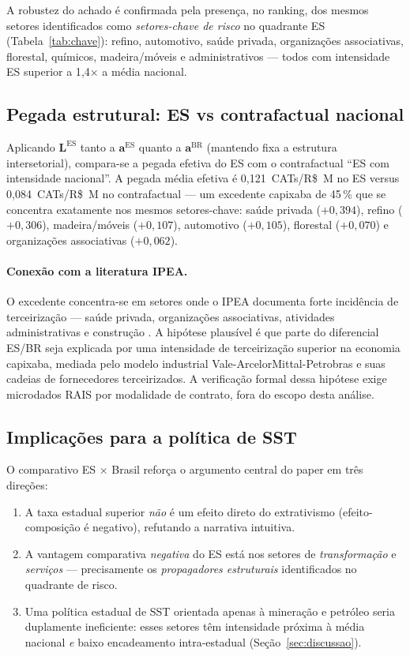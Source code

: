 \documentclass[12pt, a4paper]{article}
\begin{document}
A robustez do achado é confirmada pela presença, no ranking, dos
mesmos setores identificados como \textit{setores-chave de risco}
no quadrante ES (Tabela~\ref{tab:chave}): refino, automotivo, saúde
privada, organizações associativas, florestal, químicos, madeira/móveis
e administrativos --- todos com intensidade ES superior a 1{,}4× a
média nacional.

\subsection{Pegada estrutural: ES vs contrafactual nacional}

Aplicando $\mathbf{L}^{\text{ES}}$ tanto a $\mathbf{a}^{\text{ES}}$
quanto a $\mathbf{a}^{\text{BR}}$ (mantendo fixa a estrutura
intersetorial), compara-se a pegada efetiva do ES com o contrafactual
``ES com intensidade nacional''. A pegada média efetiva é
0{,}121~CATs/R\$~M no ES versus 0{,}084~CATs/R\$~M no contrafactual ---
um excedente capixaba de 45\,\% que se concentra exatamente nos
mesmos setores-chave: saúde privada ($+0{,}394$), refino ($+0{,}306$),
madeira/móveis ($+0{,}107$), automotivo ($+0{,}105$), florestal
($+0{,}070$) e organizações associativas ($+0{,}062$).

\paragraph{Conexão com a literatura IPEA.}
O excedente concentra-se em setores onde o IPEA documenta forte
incidência de terceirização --- saúde privada, organizações
associativas, atividades administrativas e construção
\citep{ipea2024terc}. A hipótese plausível é que parte do diferencial
ES/BR seja explicada por uma intensidade de terceirização superior
na economia capixaba, mediada pelo modelo industrial Vale-ArcelorMittal-Petrobras
e suas cadeias de fornecedores terceirizados. A verificação formal
dessa hipótese exige microdados RAIS por modalidade de contrato,
fora do escopo desta análise.

\subsection{Implicações para a política de SST}

O comparativo ES $\times$ Brasil reforça o argumento central do paper
em três direções:
%
\begin{enumerate}
  \item A taxa estadual superior \textit{não} é um efeito direto do
    extrativismo (efeito-composição é negativo), refutando a narrativa
    intuitiva.
  \item A vantagem comparativa \textit{negativa} do ES está nos
    setores de \textit{transformação} e \textit{serviços} ---
    precisamente os \textit{propagadores estruturais} identificados
    no quadrante de risco.
  \item Uma política estadual de SST orientada apenas à mineração e
    petróleo seria duplamente ineficiente: esses setores têm
    intensidade próxima à média nacional \textit{e} baixo encadeamento
    intra-estadual (Seção~\ref{sec:discussao}).
\end{enumerate}
\end{document}
